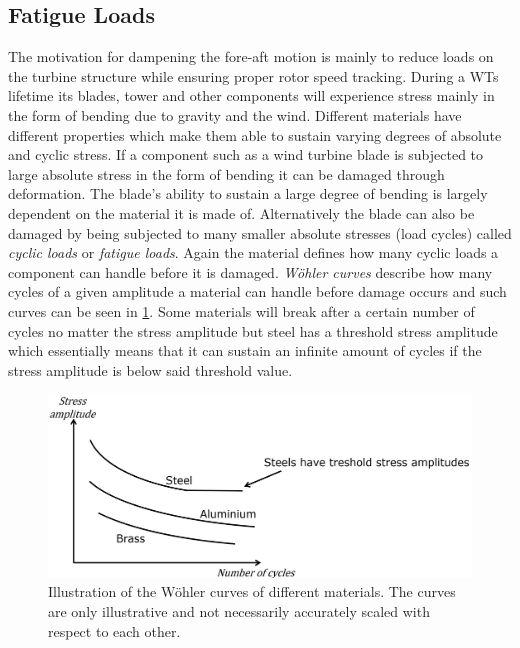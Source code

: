 \subsection{Fatigue Loads}
The motivation for dampening the fore-aft motion is mainly to reduce loads on the turbine structure while ensuring proper rotor speed tracking. During a WTs lifetime its blades, tower and other components will experience stress mainly in the form of bending due to gravity and the wind. Different materials have different properties which make them able to sustain varying degrees of absolute and cyclic stress. If a component such as a wind turbine blade is subjected to large absolute stress in the form of bending it can be damaged through deformation. The blade's ability to sustain a large degree of bending is largely dependent on the material it is made of. Alternatively the blade can also be damaged by being subjected to many smaller absolute stresses (load cycles) called \textit{cyclic loads} or \textit{fatigue loads}. Again the material defines how many cyclic loads a component can handle before it is damaged. \textit{Wöhler curves} describe how many cycles of a given amplitude a material can handle before damage occurs and such curves can be seen in \cref{fig:woher_curve}. Some materials will break after a certain number of cycles no matter the stress amplitude but steel has a threshold stress amplitude which essentially means that it can sustain an infinite amount of cycles if the stress amplitude is below said threshold value.

\begin{figure}[ht]
	\centering
	\includegraphics[width=0.6\linewidth]{Graphics/WohlerCurve.png}
	\caption{Illustration of the Wöhler curves of different materials. The curves are only illustrative and not necessarily accurately scaled with respect to each other.}
	\label{fig:woher_curve}
\end{figure}

